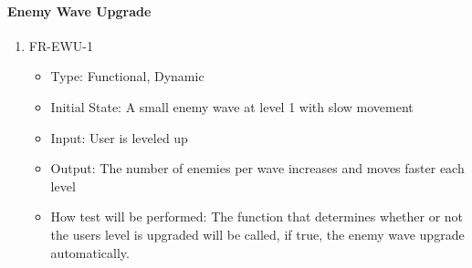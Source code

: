 \documentclass[12,english]{article}
\begin{document}
\paragraph{Enemy Wave Upgrade}
\begin{enumerate}
  \item FR-EWU-1
  \begin{itemize}
      \item Type: Functional, Dynamic
      \item Initial State: A small enemy wave at level 1 with slow movement
      \item Input: User is leveled up 
      \item Output: The number of enemies per wave increases and moves faster each level
      \item How test will be performed: The function that determines whether or not the user\textcolor{red}{\textquotesingle}s level is upgraded will be called, if true,  the enemy wave upgrade automatically.  
  \end{itemize}
\end{enumerate}
\end{document}
